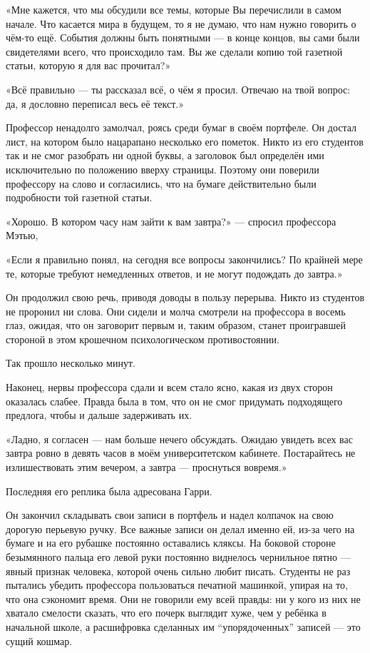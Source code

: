 \documentclass[a5paper, 9pt,
final, openany, twoside=true]{memoir}
\begin{document}
«Мне кажется, что мы обсудили все темы, которые Вы перечислили в самом начале. Что касается мира в будущем, то я не думаю, что нам нужно говорить о чём-то ещё. События должны быть понятными — в конце концов, вы сами были свидетелями всего, что происходило там. Вы же сделали копию той газетной статьи, которую я для вас прочитал?»

«Всё правильно — ты рассказал всё, о чём я просил. Отвечаю на твой вопрос: да, я дословно переписал весь её текст.»

Профессор ненадолго замолчал, роясь среди бумаг в своём портфеле. Он достал лист, на котором было нацарапано несколько его пометок. Никто из его студентов так и не смог разобрать ни одной буквы, а заголовок был определён ими исключительно по положению вверху страницы. Поэтому они поверили профессору на слово и согласились, что на бумаге действительно были подробности той газетной статьи.

«Хорошо. В котором часу нам зайти к вам завтра?» — спросил профессора Мэтью,

«Если я правильно понял, на сегодня все вопросы закончились? По крайней мере те, которые требуют немедленных ответов, и не могут подождать до завтра.»

Он продолжил свою речь, приводя доводы в пользу перерыва. Никто из студентов не проронил ни слова. Они сидели и молча смотрели на профессора в восемь глаз, ожидая, что он заговорит первым и, таким образом, станет проигравшей стороной в этом крошечном психологическом противостоянии.

Так прошло несколько минут.

Наконец, нервы профессора сдали и всем стало ясно, какая из двух сторон оказалась слабее. Правда была в том, что он не смог придумать подходящего предлога, чтобы и дальше задерживать их.

«Ладно, я согласен — нам больше нечего обсуждать. Ожидаю увидеть всех вас завтра ровно в девять часов в моём университетском кабинете. Постарайтесь не излишествовать этим вечером, а завтра — проснуться вовремя.»

Последняя его реплика была адресована Гарри.

Он закончил складывать свои записи в портфель и надел колпачок на свою дорогую перьевую ручку. Все важные записи он делал именно ей, из-за чего на бумаге и на его рубашке постоянно оставались кляксы. На боковой стороне безымянного пальца его левой руки постоянно виднелось чернильное пятно — явный признак человека, которой очень сильно любит писать. Студенты не раз пытались убедить профессора пользоваться печатной машинкой, упирая на то, что она сэкономит время. Они не говорили ему всей правды: ни у кого из них не хватало смелости сказать, что его почерк выглядит хуже, чем у ребёнка в начальной школе, а расшифровка сделанных им ``упорядоченных'' записей — это сущий кошмар.
\end{document}
